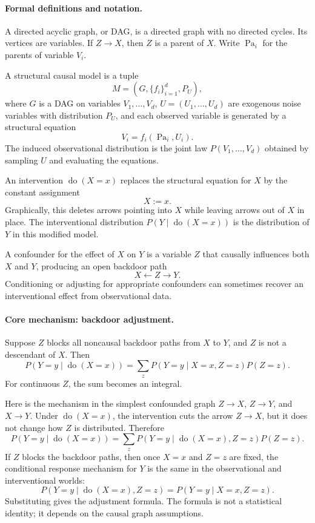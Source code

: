 \paragraph{Formal definitions and notation.}
A directed acyclic graph, or DAG, is a directed graph with no directed cycles. Its vertices are variables. If \(Z\to X\), then \(Z\) is a parent of \(X\). Write \(\operatorname{Pa}_i\) for the parents of variable \(V_i\).

A structural causal model is a tuple
\[
M=(G,\{f_i\}_{i=1}^d,P_U),
\]
where \(G\) is a DAG on variables \(V_1,\ldots,V_d\), \(U=(U_1,\ldots,U_d)\) are exogenous noise variables with distribution \(P_U\), and each observed variable is generated by a structural equation
\[
V_i=f_i(\operatorname{Pa}_i,U_i).
\]
The induced observational distribution is the joint law \(P(V_1,\ldots,V_d)\) obtained by sampling \(U\) and evaluating the equations.

An intervention \(\operatorname{do}(X=x)\) replaces the structural equation for \(X\) by the constant assignment
\[
X:=x.
\]
Graphically, this deletes arrows pointing into \(X\) while leaving arrows out of \(X\) in place. The interventional distribution \(P(Y\mid \operatorname{do}(X=x))\) is the distribution of \(Y\) in this modified model.

A confounder for the effect of \(X\) on \(Y\) is a variable \(Z\) that causally influences both \(X\) and \(Y\), producing an open backdoor path
\[
X \leftarrow Z \to Y.
\]
Conditioning or adjusting for appropriate confounders can sometimes recover an interventional effect from observational data.

\paragraph{Core mechanism: backdoor adjustment.}
Suppose \(Z\) blocks all noncausal backdoor paths from \(X\) to \(Y\), and \(Z\) is not a descendant of \(X\). Then
\[
\boxed{
P(Y=y\mid \operatorname{do}(X=x))
=\sum_z P(Y=y\mid X=x,Z=z)P(Z=z).
}
\]
For continuous \(Z\), the sum becomes an integral.

Here is the mechanism in the simplest confounded graph \(Z\to X\), \(Z\to Y\), and \(X\to Y\). Under \(\operatorname{do}(X=x)\), the intervention cuts the arrow \(Z\to X\), but it does not change how \(Z\) is distributed. Therefore
\[
P(Y=y\mid \operatorname{do}(X=x))
=\sum_z P(Y=y\mid \operatorname{do}(X=x),Z=z)P(Z=z).
\]
If \(Z\) blocks the backdoor paths, then once \(X=x\) and \(Z=z\) are fixed, the conditional response mechanism for \(Y\) is the same in the observational and interventional worlds:
\[
P(Y=y\mid \operatorname{do}(X=x),Z=z)
=P(Y=y\mid X=x,Z=z).
\]
Substituting gives the adjustment formula. The formula is not a statistical identity; it depends on the causal graph assumptions.

